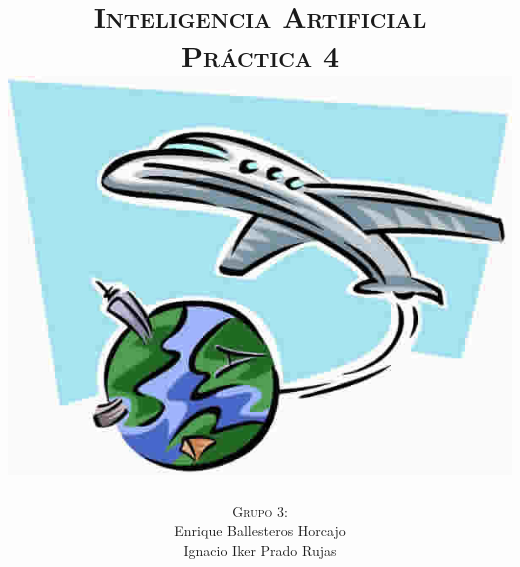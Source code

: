 \documentclass[11pt, a4paper, spanish, openright, twoside]{book}
\begin{document}
 
\title{\Huge{\textsc{Inteligencia Artificial}} \\
	\vspace{0.7cm}
	 \textsc{\Large{Práctica 4}} \\
	\vspace{1.5cm}
	\includegraphics[scale=0.45]{viaje}}
\author{\textsc{Grupo 3:}\\
	Enrique Ballesteros Horcajo\\
	Ignacio Iker Prado Rujas}
\date{\Today}
\maketitle

\newpage
\mbox{}
\thispagestyle{empty}						%
\newpage


\tableofcontents 							%

\newpage
\mbox{}
\thispagestyle{empty}						%
\newpage


\vspace{3cm}


\newpage
\end{document}
